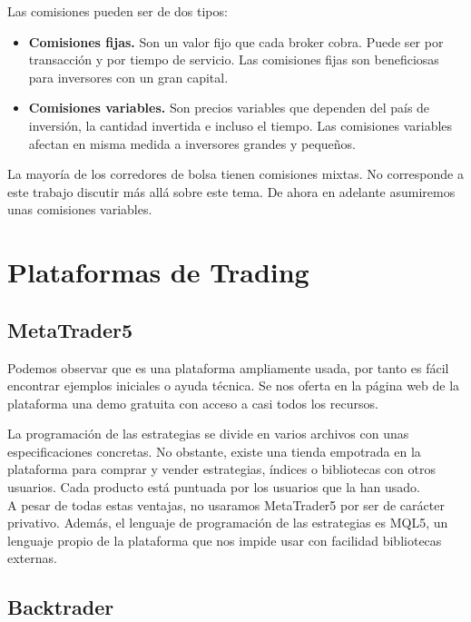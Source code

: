 \documentclass[12pt,a4paper]{article}
\begin{document}
		Las comisiones pueden ser de dos tipos:
		
		\begin{itemize}
			\item \textbf{Comisiones fijas.} Son un valor fijo que cada broker cobra. Puede ser por transacci\'on y por tiempo de servicio. Las comisiones fijas son beneficiosas para inversores con un gran capital.
			
			\item \textbf{Comisiones variables.} Son precios variables que dependen del país de inversión, la cantidad invertida e incluso el tiempo. Las comisiones variables afectan en misma medida a inversores grandes y peque\~nos.
		\end{itemize}
		
		La mayor\'ia de los corredores de bolsa tienen comisiones mixtas. No corresponde a este trabajo discutir m\'as all\'a sobre este tema. De ahora en adelante asumiremos unas comisiones variables. 
	
	\newpage
	\section{Plataformas de Trading}		
	
		\subsection{MetaTrader5}
		
    	Podemos observar que es una plataforma ampliamente usada, por tanto es f\'acil encontrar ejemplos iniciales o ayuda t\'ecnica. Se nos oferta en la p\'agina web de la plataforma\cite{metatraderweb} una demo gratuita con acceso a casi todos los recursos. 
		
		La programaci\'on de las estrategias se divide en varios archivos con unas especificaciones concretas. No obstante, existe una tienda empotrada en la plataforma para comprar y vender estrategias, \'indices o bibliotecas con otros usuarios. Cada producto est\'a puntuada por los usuarios que la han usado.\\
		
		A pesar de todas estas ventajas, no usaramos MetaTrader5 por ser de car\'acter privativo. Adem\'as, el lenguaje de programaci\'on de las estrategias es MQL5, un lenguaje propio de la plataforma que nos impide usar con facilidad bibliotecas externas.
	
		\subsection{Backtrader}
		
\end{document}
